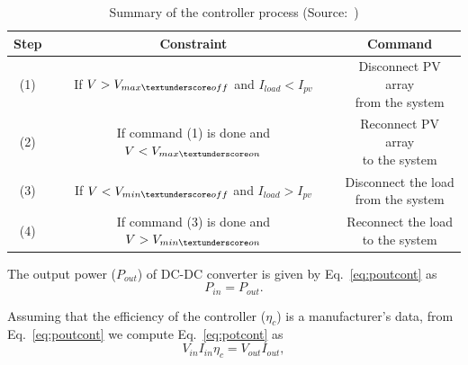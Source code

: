 \documentclass[journal]{IEEEtran}
\begin{document}
\begin{table}[!t]
\renewcommand{\arraystretch}{1.3}
\caption{Summary of the controller process (Source:~\cite{Hansen})}
\label{table:controller}
\centering
\begin{tabular}{c | c | c }
\hline
\hline
Step  & Constraint & Command\\
\hline
\hline
(1) & \makecell{If $V > V_{max \textunderscore off}$ \\and $I_{load} < I_{pv}$} & \makecell{Disconnect PV array \\from the system}\\
\hline
(2) & \makecell{If command (1) is \\done and $V < V_{max \textunderscore on}$} & \makecell{Reconnect PV array \\to the system}\\
\hline
(3) & \makecell{If $V < V_{min \textunderscore off}$ and \\ $I_{load} > I_{pv}$} & \makecell{Disconnect the load \\from the system}\\
\hline
(4) & \makecell{If command (3) is \\ done and $V > V_{min \textunderscore on}$} & \makecell{Reconnect the load \\to the system}\\
\hline
\hline
\end{tabular}
\end{table}

%
The output power ($ P_{out} $) of DC-DC converter is given by Eq.~\eqref{eq:poutcont} as
\begin{equation}
\label{eq:poutcont}
P_{in} = P_{out}.
\end{equation}

Assuming that the efficiency of the controller ($ \eta_{c} $) is a manufacturer's data, from Eq.~\eqref{eq:poutcont} we compute Eq.~\eqref{eq:potcont} as
\begin{equation}
\label{eq:potcont}
V_{in} I_{in} \eta_{c} = V_{out} I_{out},
\end{equation}
\end{document}
